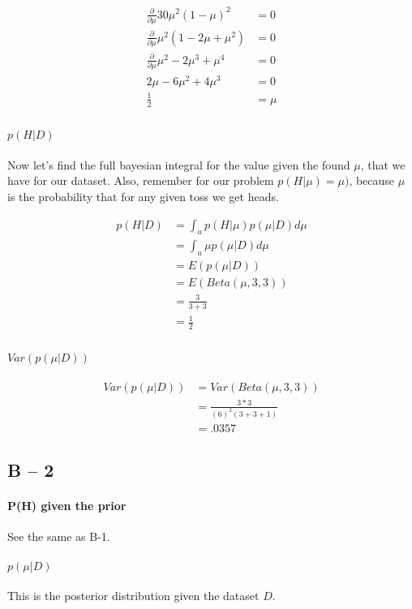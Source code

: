 \documentclass[paper=a4, fontsize=11pt]{scrartcl} %
\begin{document}
\begin{align}
\frac{\partial}{\partial \mu} 30 \mu^2(1-\mu)^2 &= 0 \\
\frac{\partial}{\partial \mu} \mu^2 (1 -2\mu + \mu^2) &= 0 \\
\frac{\partial}{\partial \mu} \mu^2 -2 \mu^3 + \mu^4 &= 0 \\
2\mu -6\mu^2 + 4\mu^3 &= 0 \\
\frac{1}{2} &= \mu \\
\end{align}

\paragraph{$p(H|D)$}
Now let's find the full bayesian integral for the value given the found $\mu$, that we have for our dataset.  Also, remember for our problem $p(H|\mu) = \mu)$, because $\mu$ is the probability that for any given toss we get heads.

\begin{align}
p(H|D) &= \int_u p(H|\mu)p(\mu|D)d\mu \\
&= \int_u \mu p(\mu|D)d\mu \\
&= E( p(\mu|D)) \\
&= E( Beta(\mu,3,3)) \\
&= \frac{3}{3+3} \\
&= \frac{1}{2} \\
\end{align}

\paragraph{$Var(p(\mu|D))$}

\begin{align}
Var(p(\mu|D)) &=  Var(Beta(\mu,3,3)) \\
&= \frac{3*3}{(6)^2(3+3+1)} \\
&= .0357
\end{align}

\subsection{B -- 2}
\paragraph{P(H) given the prior}
See the same as B-1.

\paragraph{$p(\mu|D)$}
This is the posterior distribution given the dataset $D$.
\end{document}
